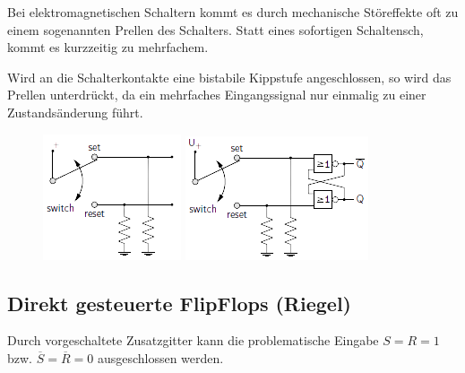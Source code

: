 \documentclass[12pt]{report}
\begin{document}
\begin{exbox}
  Bei elektromagnetischen Schaltern kommt es durch mechanische Störeffekte oft zu einem sogenannten Prellen des Schalters.
  Statt eines sofortigen Schaltensch, kommt es kurzzeitig zu mehrfachem.
  
  \par Wird an die Schalterkontakte eine bistabile Kippstufe angeschlossen, so wird das Prellen unterdrückt,
  da ein mehrfaches Eingangssignal nur einmalig zu einer Zustandsänderung führt.
  \begin{figure}[H]
    \begin{minipage}[t]{0.45\textwidth}
      \centering
      \includegraphics{riegel_prellender_schalter}
    \end{minipage}
    \hfill
    \begin{minipage}[t]{0.45\textwidth}
      \centering
      \includegraphics{riegel_prellfreier_schalter}
    \end{minipage}
  \end{figure}
\end{exbox}

\subsection{Direkt gesteuerte FlipFlops (Riegel)}
Durch vorgeschaltete Zusatzgitter kann die problematische Eingabe $S=R=1$ bzw. $\overline{S} = \overline{R}=0$ ausgeschlossen werden.
\end{document}
